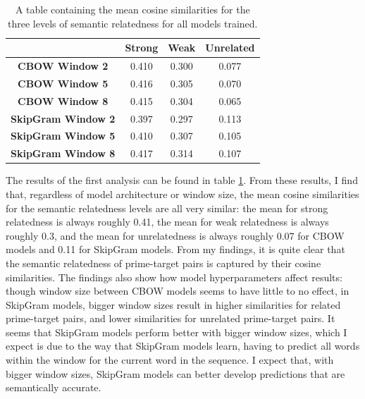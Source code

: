 \documentclass{IEEEtran}
\begin{document}
\begin{table}[h]
    \centering
    \begin{tabular}{c|c|c|c}
        & \textbf{Strong} & \textbf{Weak} & \textbf{Unrelated} \\
        \hline \hline
        \textbf{CBOW Window 2} &0.410 &0.300 &0.077 \\
        \textbf{CBOW Window 5} &0.416 &0.305 &0.070 \\
        \textbf{CBOW Window 8} &0.415 &0.304 &0.065 \\
        \textbf{SkipGram Window 2} &0.397 &0.297 &0.113 \\
        \textbf{SkipGram Window 5} &0.410 &0.307 &0.105 \\
        \textbf{SkipGram Window 8} &0.417 &0.314 &0.107 
    \end{tabular}
    \caption{A table containing the mean cosine similarities for the three levels of semantic relatedness for all models trained.}
    \label{tab:mean_cosine_similarity_by_semantic_relatedness}
\end{table}

The results of the first analysis can be found in table \ref{tab:mean_cosine_similarity_by_semantic_relatedness}.
From these results, I find that, regardless of model architecture or window size, the mean cosine similarities for the semantic relatedness levels are all very similar: the mean for strong relatedness is always roughly 0.41, the mean for weak relatedness is always roughly 0.3, and the mean for unrelatedness is always roughly 0.07 for CBOW models and 0.11 for SkipGram models.
From my findings, it is quite clear that the semantic relatedness of prime-target pairs is captured by their cosine similarities.
The findings also show how model hyperparameters affect results: though window size between CBOW models seems to have little to no effect, in SkipGram models, bigger window sizes result in higher similarities for related prime-target pairs, and lower similarities for unrelated prime-target pairs.
It seems that SkipGram models perform better with bigger window sizes, which I expect is due to the way that SkipGram models learn, having to predict all words within the window for the current word in the sequence.
I expect that, with bigger window sizes, SkipGram models can better develop predictions that are semantically accurate.
\end{document}
